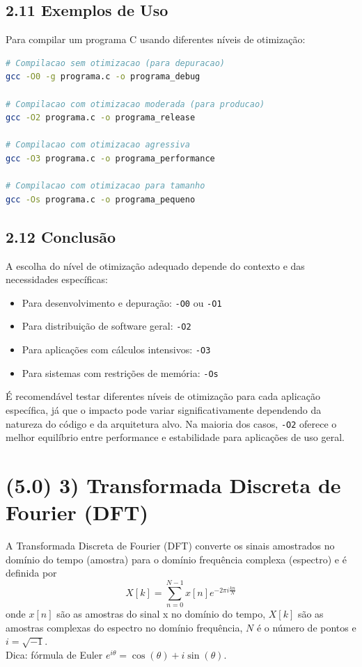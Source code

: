\documentclass[12pt,a4paper]{article}
\begin{document}
\subsection*{2.11 Exemplos de Uso}
Para compilar um programa C usando diferentes níveis de otimização:
\begin{lstlisting}[language=bash]
# Compilacao sem otimizacao (para depuracao)
gcc -O0 -g programa.c -o programa_debug

# Compilacao com otimizacao moderada (para producao)
gcc -O2 programa.c -o programa_release

# Compilacao com otimizacao agressiva
gcc -O3 programa.c -o programa_performance

# Compilacao com otimizacao para tamanho
gcc -Os programa.c -o programa_pequeno
\end{lstlisting}

\subsection*{2.12 Conclusão}
A escolha do nível de otimização adequado depende do contexto e das necessidades específicas:
\begin{itemize}[leftmargin=*]
    \item Para desenvolvimento e depuração: \texttt{-O0} ou \texttt{-O1}
    \item Para distribuição de software geral: \texttt{-O2}
    \item Para aplicações com cálculos intensivos: \texttt{-O3}
    \item Para sistemas com restrições de memória: \texttt{-Os}
\end{itemize}
É recomendável testar diferentes níveis de otimização para cada aplicação específica, já que o impacto pode variar significativamente dependendo da natureza do código e da arquitetura alvo. Na maioria dos casos, \texttt{-O2} oferece o melhor equilíbrio entre performance e estabilidade para aplicações de uso geral.


\newpage
\section*{(5.0) 3) Transformada Discreta de Fourier (DFT)}

A Transformada Discreta de Fourier (DFT) converte os sinais amostrados no domínio do tempo (amostra) para o domínio frequência complexa (espectro) e é definida por
\[
X[k] = \sum_{n=0}^{N-1} x[n] e^{-2\pi i \frac{k n}{N}}
\]
onde $x[n]$ são as amostras do sinal x no domínio do tempo, $X[k]$ são as amostras complexas do espectro no domínio frequência, $N$ é o número de pontos e $i=\sqrt{-1}$. \\
Dica: fórmula de Euler $e^{i\theta} = \cos(\theta) + i\sin(\theta)$.
\end{document}
